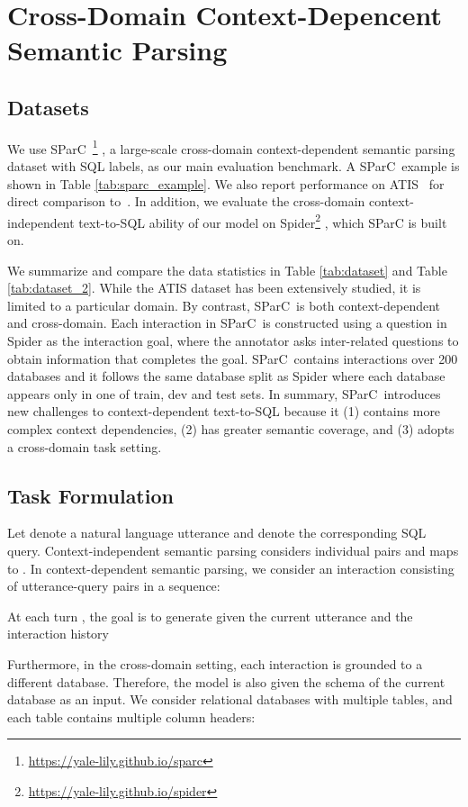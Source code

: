 \documentclass[11pt,a4paper]{article}
\newcommand{\sparc}{SParC\ }
\begin{document}
\section{Cross-Domain Context-Depencent Semantic Parsing}
\subsection{Datasets}
We use \sparc\footnote{\url{https://yale-lily.github.io/sparc}} \cite{yu2019sparc}, a large-scale cross-domain context-dependent semantic parsing dataset with SQL labels, as our main evaluation benchmark.
A \sparc example is shown in Table \ref{tab:sparc_example}.
We also report performance on ATIS~\cite{hemphill1990atis,Dahl94} for direct comparison to~.
In addition, we evaluate the cross-domain context-independent text-to-SQL ability of our model on Spider\footnote{\url{https://yale-lily.github.io/spider}} \cite{yu2018spider}, which SParC is built on.


We summarize and compare the data statistics in Table \ref{tab:dataset} and Table \ref{tab:dataset_2}.
While the ATIS dataset has been extensively studied, it is limited to a particular domain.
By contrast, \sparc is both context-dependent and cross-domain.
Each interaction in \sparc is constructed using a question in Spider as the interaction goal, where the annotator asks inter-related questions to obtain information that completes the goal.
\sparc contains interactions over 200 databases and it follows the same database split as Spider where each database appears only in one of train, dev and test sets.
In summary, \sparc introduces new challenges to context-dependent text-to-SQL because it (1) contains more complex context dependencies, (2) has greater semantic coverage, and (3) adopts a cross-domain task setting.

\subsection{Task Formulation}
Let  denote a natural language utterance and  denote the corresponding SQL query.
Context-independent semantic parsing considers individual  pairs and maps  to .
In context-dependent semantic parsing, we consider an interaction  consisting of  utterance-query pairs in a sequence: 

At each turn , the goal is to generate  given the current utterance  and the interaction history 


Furthermore, in the cross-domain setting, each interaction is grounded to a different database.
Therefore, the model is also given the schema of the current database as an input.
We consider relational databases with multiple tables, and each table contains multiple column headers:
\end{document}

